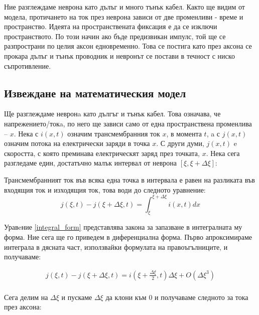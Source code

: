 \documentclass{article}
\numberwithin{equation}{section}
\begin{document}
        Ние разглеждаме неврона като дълъг и много тънък кабел. Както ще видим от модела, протичането на ток през неврона
        зависи от две променливи - време и пространство. Идеята на пространствената фиксация е да се изключи пространството.
        По този начин ако бъде предизвикан импулс, той ще се разпространи по целия аксон едновременно. Това се постига като
        през аксона се прокара дълъг и тънък проводник и невронът се постави в течност с ниско съпротивление.
    \subsection{Извеждане на математическия модел}
    Ще разглеждаме невронa като дългъг и тънък кабел. Това означава, че напрежението/токa, по него ще зависи само от една пространствена
    променлива -- $x$. Нека с $i\left(x, t\right)$ означим трансмембранния ток $x$, в момента $t$, a с $j\left(x, t\right)$ означим потока на електрически заряди в точка $x$. С други думи, $j\left(x, t\right)$ e
    скоростта, с която преминава електрическят заряд през точката, $x$. Нека сега разгледаме един, достатъчно малък интервал от неврона
    $\left[\xi, \xi+\Delta\xi\right]$:

    \begin{figure}[H]
        
        \caption{}
    \end{figure}

    Трансмембранният ток във всяка една точка в интервала е равен на разликата във входящия ток и изходящия ток, това води до следното уравнение:
    \begin{equation}\label{integral_form}
        j\left(\xi,t\right) - j\left(\xi + \Delta\xi, t\right) = \int_{\xi}^{\xi + \Delta\xi} i\left(x,t\right)dx
    \end{equation}

Уравeние \eqref{integral_form} представлява закона за запазване в интегралната му форма. Ние сега ще го приведем в диференциална форма.
Първо апроксимираме интеграла в дясната част, използвайки формулата на правоъгълниците, и получаваме:

    \begin{gather*} 
        j\left(\xi,t\right) - j\left(\xi + \Delta\xi, t\right) = i\left(\xi + \frac{\Delta\xi}{2},t\right)\Delta\xi +
        O\left(\Delta\xi^3\right)\\
     \end{gather*}

    Сега делим на $\Delta\xi$ и пускаме $\Delta\xi$ да клони към 0 и получаваме следното за тока през аксона:
     
\end{document}
